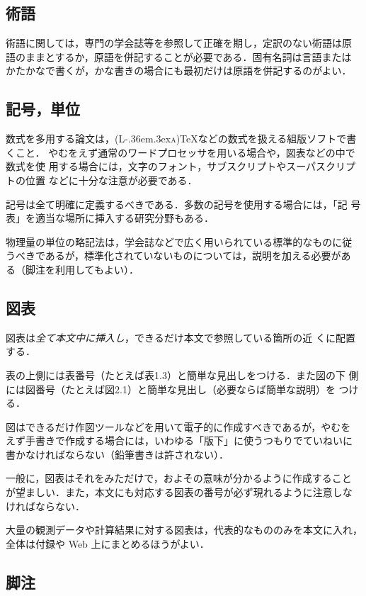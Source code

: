 \documentclass{newkuisthesis}
\def\LATEX{{\rmfamily (L\kern-.36em\raise.3ex\hbox{\scshape a})\TeX}}
\begin{document}
\subsection{術語}
術語に関しては，専門の学会誌等を参照して正確を期し，定訳のない術語は原
語のままとするか，原語を併記することが必要である．固有名詞は言語または
かたかなで書くが，かな書きの場合にも最初だけは原語を併記するのがよい．

\subsection{記号，単位}\label{subsec-symbol}
数式を多用する論文は，\LATEX などの数式を扱える組版ソフトで書くこと．
やむをえず通常のワードプロセッサを用いる場合や，図表などの中で数式を使
用する場合には，文字のフォント，サブスクリプトやスーパスクリプトの位置
などに十分な注意が必要である．

記号は全て明確に定義するべきである．多数の記号を使用する場合には，「記
  号表」を適当な場所に挿入する研究分野もある．

物理量の単位の略記法は，学会誌などで広く用いられている標準的なものに従
うべきであるが，標準化されていないものについては，説明を加える必要があ
る（脚注を利用してもよい）．

\subsection{図表}\label{subsec-figure}
図表は\emph{全て本文中に挿入し}，できるだけ本文で参照している箇所の近
くに配置する．

表の上側には表番号（たとえば表1.3）と簡単な見出しをつける．また図の下
側には図番号（たとえば図2.1）と簡単な見出し（必要ならば簡単な説明）を
つける．

図はできるだけ作図ツールなどを用いて電子的に作成すべきであるが，やむを
えず手書きで作成する場合には，いわゆる「版下」に使うつもりでていねいに
書かなければならない（鉛筆書きは許されない）．

一般に，図表はそれをみただけで，およその意味が分かるように作成すること
が望ましい．また，本文にも対応する図表の番号が必ず現れるように注意しな
ければならない．

大量の観測データや計算結果に対する図表は，代表的なもののみを本文に入れ，
全体は付録や Web 上にまとめるほうがよい．

\subsection{脚注}\label{subsec-footnote}
\end{document}
